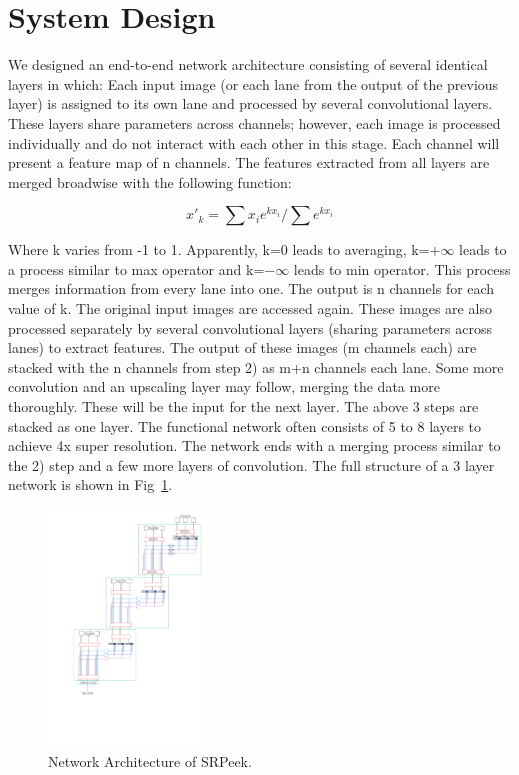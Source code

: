 \section{System Design}
\label{sec-design}
We designed an end-to-end network architecture consisting of several identical layers in which:
	Each input image (or each lane from the output of the previous layer) is assigned to its own lane and processed by several convolutional layers. These layers share parameters across channels; however, each image is processed individually and do not interact with each other in this stage. Each channel will present a feature map of n channels.
	The features extracted from all layers are merged broadwise with the following function:


    $${x'_k=\sum x_ie^{kx_i}/\sum e^{kx_i}}$$


Where k varies from -1 to 1. Apparently, k=0 leads to averaging, k=${+\infty}$ leads to a process similar to max operator and k=${-\infty}$ leads to min operator. This process merges information from every lane into one. The output is n channels for each value of k. 
	The original input images are accessed again. These images are also processed separately by several convolutional layers (sharing parameters across lanes) to extract features. The output of these images (m channels each) are stacked with the n channels from step 2) as m+n channels each lane. Some more convolution and an upscaling layer may follow, merging the data more thoroughly. These will be the input for the next layer.
The above 3 steps are stacked as one layer. The functional network often consists of 5 to 8 layers to achieve 4x super resolution. The network ends with a merging process similar to the 2) step and a few more layers of convolution. The full structure of a 3 layer network is shown in Fig~\ref{fig-system}.

\begin{figure}
 \centering
    \includegraphics[width=0.375\textwidth]{./pic/system.png}
    \caption{Network Architecture of SRPeek.}
    \label{fig-system}
\end{figure}
